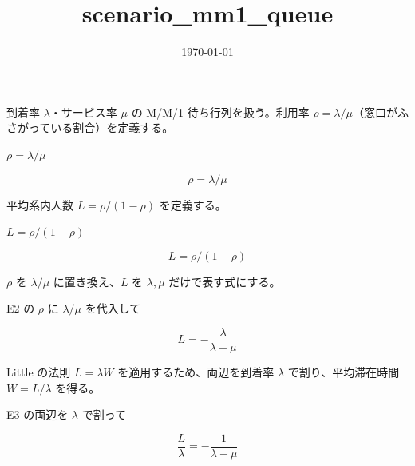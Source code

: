 \documentclass[dvipdfmx,a4paper,11pt]{jsarticle}
\title{scenario\_mm1\_queue}
\date{\today}
\begin{document}
\maketitle

到着率 $\lambda$・サービス率 $\mu$ の M/M/1 待ち行列を扱う。利用率 $\rho=\lambda/\mu$（窓口がふさがっている割合）を定義する。

$\rho = \lambda/\mu$

\begin{equation}
  \rho = \lambda/\mu
  \label{eq:E1}
\end{equation}

平均系内人数 $L=\rho/(1-\rho)$ を定義する。

$L = \rho/(1-\rho)$

\begin{equation}
  L = \rho/(1-\rho)
  \label{eq:E2}
\end{equation}

$\rho$ を $\lambda/\mu$ に置き換え、$L$ を $\lambda,\mu$ だけで表す式にする。

E2 の $\rho$ に $\lambda/\mu$ を代入して

\begin{equation}
  L = -\frac{\lambda}{\lambda-\mu}
  \label{eq:E3}
\end{equation}

Little の法則 $L=\lambda W$ を適用するため、両辺を到着率 $\lambda$ で割り、平均滞在時間 $W=L/\lambda$ を得る。

E3 の両辺を $\lambda$ で割って

\begin{equation}
  \frac{L}{\lambda} = -\frac{1}{\lambda-\mu}
  \label{eq:E4}
\end{equation}
\end{document}
